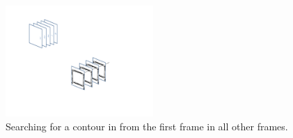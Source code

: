 \begin{figure}[H]
\begin{center}
\leavevmode
\includegraphics[width=0.5\textwidth]{images/image_seq_pool.pdf}
\end{center}
\caption{Searching for a contour in from the first frame in all other frames.}
\label{fig:seq_img_pool}
\end{figure}

